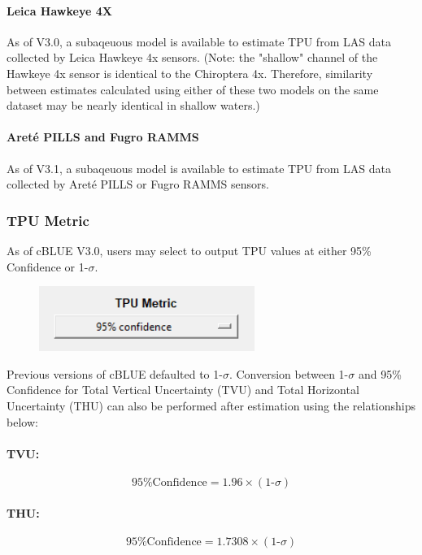 \documentclass[11pt, a4paper]{article}
\begin{document}
\paragraph{Leica Hawkeye 4X}
As of V3.0, a subaqeuous model is available to estimate TPU from LAS data collected by Leica Hawkeye 4x sensors. (Note: the "shallow" channel of the Hawkeye 4x sensor is identical to the Chiroptera 4x. Therefore, similarity between estimates calculated using either of these two models on the same dataset may be nearly identical in shallow waters.)

\paragraph{Areté PILLS and Fugro RAMMS}
As of V3.1, a subaqeuous model is available to estimate TPU from LAS data collected by Areté PILLS or Fugro RAMMS sensors.

\subsubsection{TPU Metric}
As of cBLUE V3.0, users may select to output TPU values at either 95\% Confidence or 1-$\sigma$. 

\begin{figure}[H]
    \centering
    \includegraphics[width=7cm]{figs/tpu_metric_gui.png}
\end{figure}

Previous versions of cBLUE defaulted to 1-$\sigma$. Conversion between 1-$\sigma$ and 95\% Confidence for Total Vertical Uncertainty (TVU) and Total Horizontal Uncertainty (THU) can also be performed after estimation using the relationships below:
\paragraph{TVU:}
\begin{equation*}
    \text{95\% Confidence} = 1.96 \times (\text{1-$\sigma$})
\end{equation*}

\paragraph{THU:}
\begin{equation*}
    \text{95\% Confidence} = 1.7308 \times (\text{1-$\sigma$})
\end{equation*}
\end{document}
